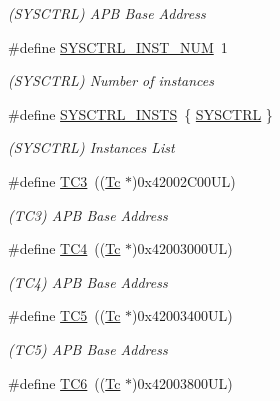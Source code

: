 \begin{DoxyCompactItemize}
\begin{DoxyCompactList}\small\item\em (S\+Y\+S\+C\+T\+RL) A\+PB Base Address \end{DoxyCompactList}\item 
\#define \mbox{\hyperlink{group___s_a_m_d21_g15_l__base_ga495a137cee2c9c865f8dbab50616d71f}{S\+Y\+S\+C\+T\+R\+L\+\_\+\+I\+N\+S\+T\+\_\+\+N\+UM}}~1
\begin{DoxyCompactList}\small\item\em (S\+Y\+S\+C\+T\+RL) Number of instances \end{DoxyCompactList}\item 
\#define \mbox{\hyperlink{group___s_a_m_d21_g15_l__base_ga5fe4eb4329cd6e474576a0adb5be13c0}{S\+Y\+S\+C\+T\+R\+L\+\_\+\+I\+N\+S\+TS}}~\{ \mbox{\hyperlink{group___s_a_m_d21_j18_a__base_gaf94c5196d5506d0a34a0938d9bdb480f}{S\+Y\+S\+C\+T\+RL}} \}
\begin{DoxyCompactList}\small\item\em (S\+Y\+S\+C\+T\+RL) Instances List \end{DoxyCompactList}\item 
\#define \mbox{\hyperlink{group___s_a_m_d21_g15_l__base_ga96dbeca00ecf683666f989fbc2425d89}{T\+C3}}~((\mbox{\hyperlink{union_tc}{Tc}}       $\ast$)0x42002\+C00\+U\+L)
\begin{DoxyCompactList}\small\item\em (T\+C3) A\+PB Base Address \end{DoxyCompactList}\item 
\#define \mbox{\hyperlink{group___s_a_m_d21_g15_l__base_ga877f51fe7311fbc9c49c966ba738be05}{T\+C4}}~((\mbox{\hyperlink{union_tc}{Tc}}       $\ast$)0x42003000\+U\+L)
\begin{DoxyCompactList}\small\item\em (T\+C4) A\+PB Base Address \end{DoxyCompactList}\item 
\#define \mbox{\hyperlink{group___s_a_m_d21_g15_l__base_ga410ec3addea710896df03e12e3fb75da}{T\+C5}}~((\mbox{\hyperlink{union_tc}{Tc}}       $\ast$)0x42003400\+U\+L)
\begin{DoxyCompactList}\small\item\em (T\+C5) A\+PB Base Address \end{DoxyCompactList}\item 
\#define \mbox{\hyperlink{group___s_a_m_d21_g15_l__base_gae5a1efa96ea067fb3907f342aa6fb0a4}{T\+C6}}~((\mbox{\hyperlink{union_tc}{Tc}}       $\ast$)0x42003800\+U\+L)

\end{DoxyCompactItemize}
